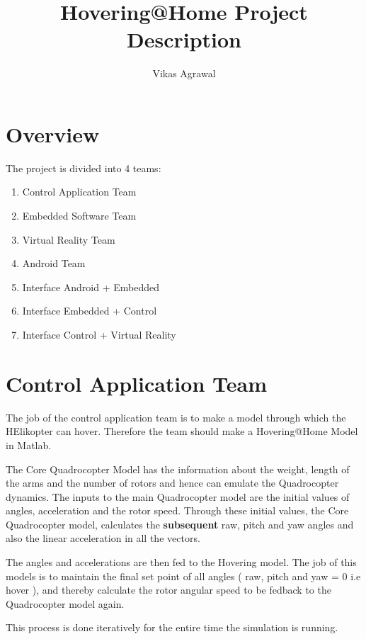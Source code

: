 \documentclass[a4paper,11pt]{article}
\title{Hovering@Home Project Description}
\author{Vikas Agrawal}
\begin{document}

\maketitle
\tableofcontents

\pagebreak

\section{Overview}

The project is divided into 4 teams:
\begin{enumerate}
    \item Control Application Team
    \item Embedded Software Team
    \item Virtual Reality Team
    \item Android Team
    \item Interface Android + Embedded
    \item Interface Embedded + Control
    \item Interface Control + Virtual Reality

\end{enumerate}

\pagebreak

\section{Control Application Team}

The job of the control application team is to make a model through which the HElikopter can
hover. Therefore the team should make a Hovering@Home Model in Matlab.

The Core Quadrocopter Model has the information about the weight, length of the arms and the number of rotors and hence can emulate the Quadrocopter dynamics.
The inputs to the main Quadrocopter model are the initial values of angles, acceleration and the rotor speed.
Through these initial values, the Core Quadrocopter model, calculates the \textbf{subsequent} raw, pitch and yaw angles and also the linear acceleration in all the vectors.

The angles and accelerations are then fed to the Hovering model. The job of this models is to maintain the final set point of all angles ( raw, pitch and yaw = 0 i.e hover ), and thereby calculate the rotor angular speed to be fedback to the Quadrocopter model again. 

This process is done iteratively for the entire time the simulation is running.
\end{document}
